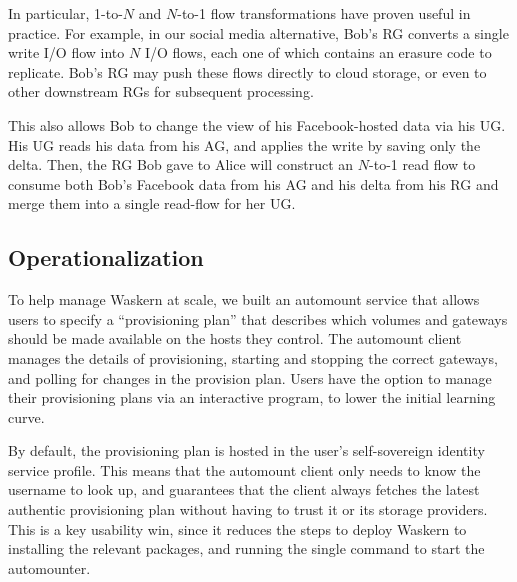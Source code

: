 In particular, 1-to-$N$ and $N$-to-1 flow transformations have proven useful in
practice.  For example, in our social media alternative, Bob's RG
converts a single write I/O flow into $N$ I/O flows, each one of which
contains an erasure code to replicate.  Bob's RG may push these flows directly
to cloud storage, or even to other downstream RGs for subsequent processing.

This also allows Bob to change the view of his Facebook-hosted data via his UG.
His UG reads his data from his AG, and applies the write by saving only the delta.
Then, the RG Bob gave to Alice will construct an
$N$-to-1 read flow to consume both Bob's Facebook data from his AG and his delta
from his RG and merge them into a single read-flow for her UG.

\subsection{Operationalization}

To help manage Waskern at scale, we built an automount service that allows
users to specify a ``provisioning plan'' that describes which volumes and
gateways should be made available on the hosts they control. The automount client manages the
details of provisioning, starting and stopping the correct gateways, and polling
for changes in the provision plan.  Users have the option to manage their provisioning plans
via an interactive program, to lower the initial learning curve.

By default, the provisioning plan is hosted in the user's self-sovereign
identity service profile.  This means that the automount client only needs to know
the username to look up, and guarantees that the client always
fetches the latest authentic provisioning plan without having to trust it or its
storage providers.  This is a key usability win, since it reduces the steps to
deploy Waskern to installing the relevant packages, and running the single
command to start the automounter.
